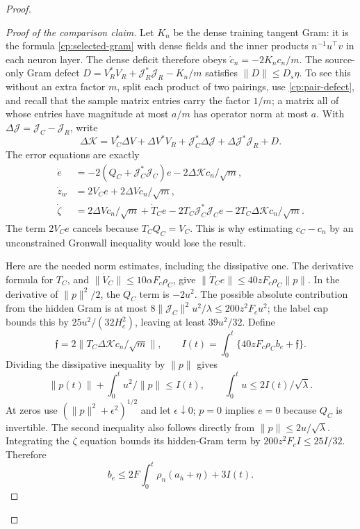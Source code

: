 \begin{proof}
\begin{proof}[Proof of the comparison claim]
Let $K_n$ be the dense training tangent Gram: it is the formula
\eqref{cp:selected-gram} with dense fields and the inner products
$n^{-1}u^\top v$ in each neuron layer. The dense deficit therefore obeys
$\dot c_n=-2K_nc_n/m$. The source-only Gram defect
$D=V_R^*V_R+\mathcal J_R^*\mathcal J_R-K_n/m$ satisfies
$\|D\|\le D_s\eta$. To see this without an extra factor $m$, split
each product of two pairings, use \eqref{cp:pair-defect}, and recall
that the sample matrix entries carry the factor $1/m$; a matrix all
of whose entries have magnitude at most $a/m$ has operator norm at
most $a$. With $\Delta\mathcal J=\mathcal J_C-\mathcal J_R$, write
\[
 \Delta\mathcal K=
 V_C^*\Delta V+\Delta V^*V_R+
 \mathcal J_C^*\Delta\mathcal J+
 \Delta\mathcal J^*\mathcal J_R+D.
\]
The error equations are exactly
\begin{align*}
 \dot e&=-2(Q_C+\mathcal J_C^*\mathcal J_C)e
                           -2\Delta\mathcal Kc_n/\sqrt m,\\
 \dot z_w&=2V_Ce+2\Delta Vc_n/\sqrt m,\\
 \dot\zeta&=2\Delta Vc_n/\sqrt m+\dot T_Ce
        -2T_C\mathcal J_C^*\mathcal J_Ce
        -2T_C\Delta\mathcal Kc_n/\sqrt m.
\end{align*}
The term $2V_Ce$ cancels because $T_CQ_C=V_C$.
This is why estimating $c_C-c_n$ by an unconstrained Gronwall
inequality would lose the result.

Here are the needed norm estimates, including the dissipative one.
The derivative formula for $T_C$, and
$\|\dot V_C\|\le10\alpha F_c\rho_C$, give
$\|\dot T_Ce\|\le40zF_c\rho_C\|p\|$.
In the derivative of $\|p\|^2/2$, the $Q_C$ term is $-2u^2$.
The possible absolute contribution from the hidden Gram is at most
$8\|\mathcal J_C\|^2u^2/\lambda\le200z^2F_cu^2$;
the label cap bounds this by $25u^2/(32H_c^2)$, leaving at least
$39u^2/32$. Define
\[
 \mathfrak f=2\|T_C\Delta\mathcal Kc_n/\sqrt m\|,\qquad
 I(t)=\int_0^t\{40zF_c\rho_C b_e+\mathfrak f\}.
\]
Dividing the dissipative inequality by $\|p\|$ gives
\[
 \|p(t)\|+\int_0^t u^2/\|p\|\le I(t),\qquad
 \int_0^t u\le2I(t)/\sqrt\lambda.
\]
At zeros use $(\|p\|^2+\epsilon^2)^{1/2}$ and let
$\epsilon\downarrow0$; $p=0$ implies $e=0$ because $Q_C$ is invertible.
The second inequality also follows directly from
$\|p\|\le2u/\sqrt\lambda$.
Integrating the $\zeta$ equation bounds its hidden-Gram term by
$200z^2F_c I\le25I/32$. Therefore
\begin{equation}
 b_e\le2F\int_0^t\rho_n(a_h+\eta)+3I(t).
 \label{cp:cancelled-energy}
\end{equation}


\end{proof}
\end{proof}
